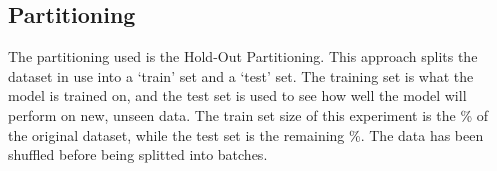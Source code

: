 \documentclass[12pt, a4paper]{article}
\begin{document}
\newpage
\subsection{Partitioning}\label{subsec:partitioning}

The partitioning used is the Hold-Out Partitioning.
This approach splits the dataset in use into a ‘train’ set and a ‘test’ set.
The training set is what the model is trained on, and the test set is used to see how
well the model will perform on new, unseen data.
\hfill\break
\hfill\break
The train set size of this experiment is the \%
of the original dataset, while the test set is the remaining \%.
\hfill\break
\hfill\break
{}
The data has been shuffled before being splitted into batches.




\end{document}
